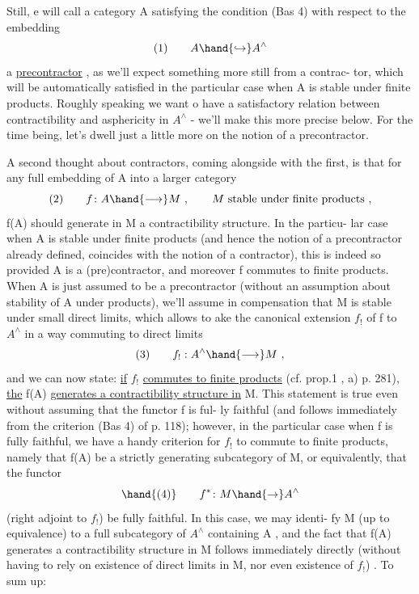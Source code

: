 
Still, e will call a category A satisfying the condition (Bas 4)
with respect to the embedding
\[ (1) \qquad A \hand{\hookrightarrow} A^{\wedge} \]
a \uline{precontractor} , as we'll expect something more still from a contrac-%
tor, which  will be automatically satisfied in the particular case
when A is stable under finite products. Roughly speaking we want o
have a satisfactory relation between contractibility and asphericity
in $A^{\wedge}$ - we'll make this more precise below. For the time being, 
let's dwell just a little more on the notion of a precontractor.

A second thought about contractors, coming alongside with the
first, is that for any full embedding of A into a larger category
\[ (2) \qquad f\colon A \hand{\longrightarrow} M \ , \qquad M \text{ stable under finite products ,} \]
f(A) should generate in M a contractibility structure. In the particu-%
lar case when A is stable under finite products (and hence the notion
of a precontractor\hand{,} already defined, coincides with the notion of a
contractor), this is indeed so provided A is  a (pre)contractor,
and moreover f commutes to finite products. When A is just assumed to
be a  precontractor (without an assumption about stability of
A under products), we'll assume in compensation that M is stable under
small direct limits, which allows to ake the canonical extension $f_{!}$
of f to $A^{\wedge}$ in a way commuting to  direct limits
\[ (3) \qquad f_{!} : A^{\wedge} \hand{\longrightarrow} M \ , \]
and we can now state: \uline{if} $f_{!}$ \uline{commutes to finite products} (cf. prop.1 ,
a) p. 281), \uline{the} f(A) \uline{generates a contractibility structure in} M.
This statement is true even without assuming that the functor f is ful-%
ly faithful (and follows immediately from the criterion (Bas 4) of
p. 118); however, in the particular case when f is fully faithful,
we have a handy criterion  for $f_{!}$ to commute to finite products, namely
that f(A) be a strictly generating subcategory of M, or equivalently,
that the functor
\[ \hand{(4)} \qquad f^{*}\colon M \hand{\to} A^{\wedge} \]
(right adjoint to $f_{!}$) be fully faithful. In this case, we may identi-%
fy M (up to equivalence) to a full subcategory of $A^{\wedge}$ containing A ,
and the fact that f(A) generates a contractibility structure in M
follows immediately directly (without having to rely on existence of
direct limits in M, nor even existence of $f_{!}$) . To sum up:


